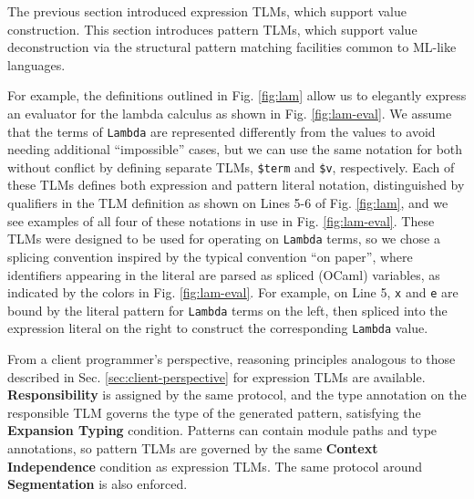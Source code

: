 \documentclass[acmsmall]{acmart}
\newcommand{\li}[1]{\lstinline[basicstyle=\ttfamily\fontsize{9pt}{1em}\selectfont]{#1}}
\begin{document}
The previous section introduced expression TLMs, which support value construction. This section introduces pattern TLMs, which support value deconstruction via the structural pattern matching facilities common to ML-like languages. 

For example, the definitions outlined in Fig. \ref{fig:lam} allow us to elegantly express an evaluator for the lambda calculus as shown in Fig. \ref{fig:lam-eval}. We assume that the terms of \li{Lambda} are represented differently from the values to avoid needing additional ``impossible'' cases, but we can use the same notation for both without conflict by defining separate TLMs, \li{$term} and \li{$v}, respectively. Each of these TLMs defines both expression and pattern literal notation, distinguished by qualifiers in the TLM definition as shown on Lines 5-6 of Fig. \ref{fig:lam}, and we see examples of all four of these notations in use in Fig. \ref{fig:lam-eval}. These TLMs were designed to be used for operating on \li{Lambda} terms, so we chose a splicing convention inspired by the typical convention ``on paper'', where identifiers appearing in the literal are parsed as spliced (OCaml) variables, as indicated by the colors in Fig. \ref{fig:lam-eval}. For example, on Line 5, \li{x} and \li{e} are bound by the literal pattern for \li{Lambda} terms on the left, then spliced into the expression literal on the right to construct the corresponding \li{Lambda} value. %

From a client programmer's perspective, reasoning principles analogous to those described in Sec. \ref{sec:client-perspective} for expression TLMs are available. \textbf{Responsibility} is assigned by the same protocol, and the type annotation on the responsible TLM governs the type of the generated pattern, satisfying the \textbf{Expansion Typing} condition. Patterns can contain module paths and type annotations, so pattern TLMs are governed by the same \textbf{Context Independence} condition as expression TLMs. The same protocol around \textbf{Segmentation} is also enforced. 
\end{document}
